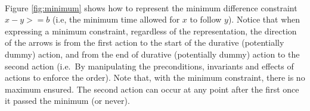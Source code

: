 \documentclass
[a4paper
,english
,parskip=half
,bibliography=totoc
]{scrreprt}
\begin{document}
        \begin{figure}[h]
            \hfill
            \\
            \vfill
            \centering
                \caption{}
                \label{fig:maximum_compact}
        \label{fig:maximum}
        \end{figure}

        
        Figure \ref{fig:minimum} shows how to represent the minimum difference constraint \(x-y>=b\) (i.e, the minimum time allowed for \(x\) to follow \(y\)). Notice that when expressing a minimum constraint, regardless of the representation, the direction of the arrows is from the first action to the start of the durative (potentially dummy) action, and from the end of durative (potentially dummy) action to the second action (i.e.\ By manipulating the preconditions, invariants and effects of actions to enforce the order). Note that, with the minimum constraint, there is no maximum ensured. The second action can occur at any point after the first once it passed the minimum (or never).
\end{document}
